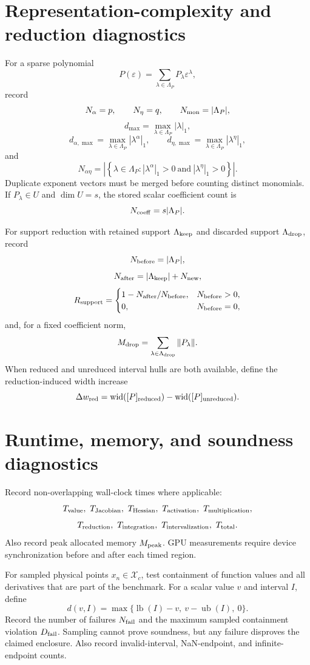 \documentclass[11pt]{article}
\newcommand{\eps}{\varepsilon}
\newcommand{\lb}{\operatorname{lb}}
\newcommand{\ub}{\operatorname{ub}}
\newcommand{\wid}{\operatorname{wid}}
\begin{document}
\section{Representation-complexity and reduction diagnostics}

For a sparse polynomial
\[
 P(\eps)=\sum_{\lambda\in\Lambda_P}P_\lambda\eps^\lambda,
\]
record
\[
 N_\alpha=p,\qquad N_\eta=q,\qquad
 N_{\rm mon}=|\Lambda_P|,
\]
\[
 d_{\max}=\max_{\lambda\in\Lambda_P}|\lambda|_1,
\]
\[
 d_{\alpha,\max}=\max_{\lambda\in\Lambda_P}|\lambda^\alpha|_1,
 \qquad
 d_{\eta,\max}=\max_{\lambda\in\Lambda_P}|\lambda^\eta|_1,
\]
and
\[
 N_{\alpha\eta}
 =\left|\left\{\lambda\in\Lambda_P:
 |\lambda^\alpha|_1>0\ \text{and}\ |\lambda^\eta|_1>0
 \right\}\right|.
\]
Duplicate exponent vectors must be merged before counting distinct monomials.
If \(P_\lambda\in U\) and \(\dim U=s\), the stored scalar coefficient count is
\[
 N_{\rm coeff}=s|\Lambda_P|.
\]

For support reduction with retained support \(\Lambda_{\rm keep}\) and
discarded support \(\Lambda_{\rm drop}\), record
\[
 N_{\rm before}=|\Lambda_P|,
\]
\[
 N_{\rm after}=|\Lambda_{\rm keep}|+N_{\rm new},
\]
\[
 R_{\rm support}
 =\begin{cases}
 1-N_{\rm after}/N_{\rm before},&N_{\rm before}>0,\\
 0,&N_{\rm before}=0,
 \end{cases}
\]
and, for a fixed coefficient norm,
\[
 M_{\rm drop}=\sum_{\lambda\in\Lambda_{\rm drop}}\|P_\lambda\|.
\]
When reduced and unreduced interval hulls are both available, define the
reduction-induced width increase
\[
 \Delta w_{\rm red}
 =\wid([P]_{\rm reduced})-\wid([P]_{\rm unreduced}).
\]

\section{Runtime, memory, and soundness diagnostics}

Record non-overlapping wall-clock times where applicable:
\[
 T_{\rm value},\ T_{\rm Jacobian},\ T_{\rm Hessian},\
 T_{\rm activation},\ T_{\rm multiplication},
\]
\[
 T_{\rm reduction},\ T_{\rm integration},\
 T_{\rm intervalization},\ T_{\rm total}.
\]
Also record peak allocated memory \(M_{\rm peak}\).  GPU measurements require
device synchronization before and after each timed region.

For sampled physical points \(x_n\in\mathcal X_c\), test containment of
function values and all derivatives that are part of the benchmark.  For a
scalar value \(v\) and interval \(I\), define
\[
 d(v,I)=\max\{\lb(I)-v,\ v-\ub(I),\ 0\}.
\]
Record the number of failures \(N_{\rm fail}\) and the maximum sampled
containment violation \(D_{\rm fail}\).  Sampling cannot prove soundness, but
any failure disproves the claimed enclosure.  Also record invalid-interval,
NaN-endpoint, and infinite-endpoint counts.
\end{document}
